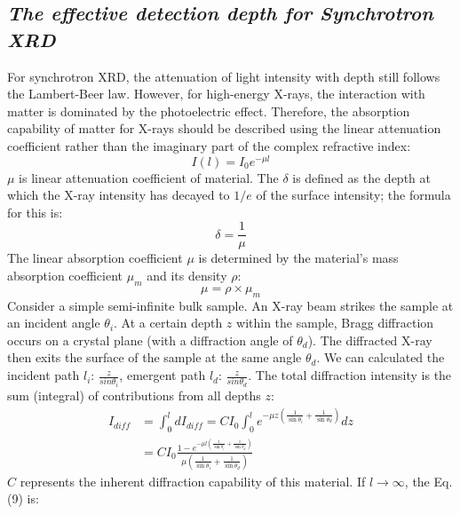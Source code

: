 \documentclass[prx,aps,twocolumn,preprintnumbers,amsmath,amssymb,superscriptaddress,showpacs]{revtex4-2}
\begin{document}
\begingroup
\renewcommand{\centering}{\raggedright}
{\subsection{\textbf{\textit{The effective detection depth for Synchrotron XRD}} }}
\endgroup
For synchrotron XRD, the attenuation of light intensity with depth still follows the Lambert-Beer law. However, for high-energy X-rays, the interaction with matter is dominated by the photoelectric effect. Therefore, the absorption capability of matter for X-rays should be described using the linear attenuation coefficient rather than the imaginary part of the complex refractive index:
\begin{equation}
I(l) = I_0 e^{-\mu l}
\label{eq:einstein}
\end{equation}
$\mu$ is linear attenuation coefficient of material. The $\delta$ is defined as the depth at which the X-ray intensity has decayed to $1/e$ of the surface intensity; the formula for this is:
\begin{equation}
\delta = \frac{1}{\mu}
\label{eq:einstein}
\end{equation}
The linear absorption coefficient $\mu$ is determined by the material’s mass absorption coefficient $\mu_m$ and its density $\rho$: 
\begin{equation}
\mu = \rho \times \mu_m
\label{eq:einstein}
\end{equation}
Consider a simple semi-infinite bulk sample. An X-ray beam strikes the sample at an incident angle $\theta_i$. At a certain depth $z$ within the sample, Bragg diffraction occurs on a crystal plane (with a diffraction angle of $\theta_d$). The diffracted X-ray then exits the surface of the sample at the same angle $\theta_d$. We can calculated the incident path $l_i$: $\frac{z}{sin\theta_i}$, emergent path  $l_d$:  $\frac{z}{sin\theta_d}$. The total diffraction intensity is the sum (integral) of contributions from all depths $z$: 
\begin{equation}
\begin{split}
I_{diff} &= \int_0^l dI_{diff} = C I_0 \int_0^l e^{-\mu z(\frac{1}{\sin \theta_i} + \frac{1}{\sin \theta_d})} dz \\
&= C I_0 \frac{1 - e^{-\mu l (\frac{1}{\sin \theta_i} + \frac{1}{\sin \theta_d})} }{\mu  (\frac{1}{\sin \theta_i} + \frac{1}{\sin \theta_d})}
\end{split}
\label{eq:einstein}
\end{equation}
$C$ represents the inherent diffraction capability of this material. If $l\to \infty$, the Eq.(9) is: 
\end{document}
